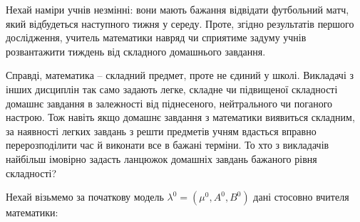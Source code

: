 \vspace{0.1cm}
\begin{mdframed}[style=text box, topline=false, bottomline=false, rightmargin=0cm, leftmargin=0cm]
    \hspace{\tabsize}
    Нехай наміри учнів незмінні: вони мають бажання відвідати футбольний матч, який відбудеться наступного тижня у середу. Проте, згідно результатів першого дослідження, учитель математики навряд чи сприятиме задуму учнів розвантажити тиждень від складного домашнього завдання. 

    Справді, математика -- складний предмет, проте не єдиний у школі. Викладачі з інших дисциплін так само задають легке, складне чи підвищеної складності домашнє завдання в залежності від піднесеного, нейтрального чи поганого настрою. Тож навіть якщо домашнє завдання з математики виявиться складним, за наявності легких завдань з решти предметів учням вдасться вправно перерозподілити час й виконати все в бажані терміни. То хто з викладачів найбільш імовірно задасть ланцюжок домашніх завдань бажаного рівня складності?
\end{mdframed}

\newpage
Нехай візьмемо за початкову модель $\lambda^0=(\mu^0,A^0,B^0)$ дані стосовно вчителя математики:

